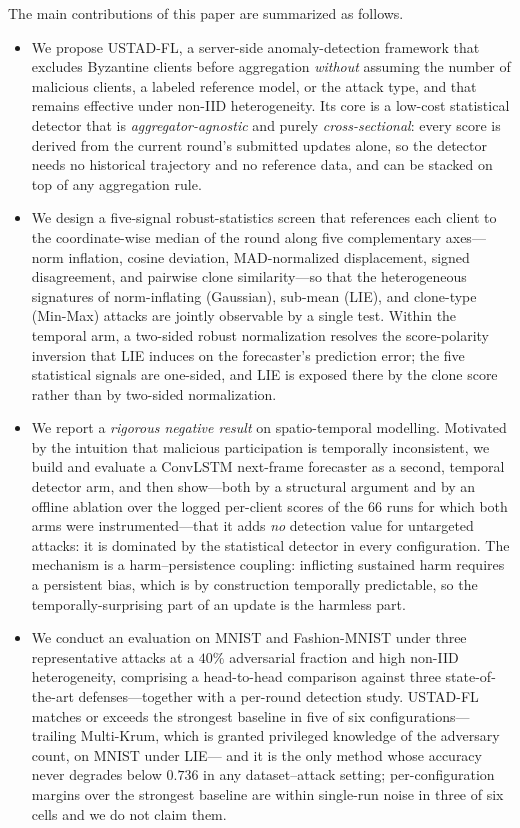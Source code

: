 \documentclass[journal]{IEEEtran}
\begin{document}
The main contributions of this paper are summarized as follows.
\begin{itemize}
    \item We propose USTAD-FL, a server-side anomaly-detection framework that excludes Byzantine clients before aggregation \emph{without} assuming the number of malicious clients, a labeled reference model, or the attack type, and that remains effective under non-IID heterogeneity. Its core is a low-cost statistical detector that is \emph{aggregator-agnostic} and purely \emph{cross-sectional}: every score is derived from the current round's submitted updates alone, so the detector needs no historical trajectory and no reference data, and can be stacked on top of any aggregation rule.
    \item We design a five-signal robust-statistics screen that references each client to the coordinate-wise median of the round along five complementary axes---norm inflation, cosine deviation, MAD-normalized displacement, signed disagreement, and pairwise clone similarity---so that the heterogeneous signatures of norm-inflating (Gaussian), sub-mean (LIE), and clone-type (Min-Max) attacks are jointly observable by a single test. Within the temporal arm, a two-sided robust normalization resolves the score-polarity inversion that LIE induces on the forecaster's prediction error; the five statistical signals are one-sided, and LIE is exposed there by the clone score rather than by two-sided normalization.
    \item We report a \emph{rigorous negative result} on spatio-temporal modelling. Motivated by the intuition that malicious participation is temporally inconsistent, we build and evaluate a ConvLSTM next-frame forecaster as a second, temporal detector arm, and then show---both by a structural argument and by an offline ablation over the logged per-client scores of the $66$ runs for which both arms were instrumented---that it adds \emph{no} detection value for untargeted attacks: it is dominated by the statistical detector in every configuration. The mechanism is a harm--persistence coupling: inflicting sustained harm requires a persistent bias, which is by construction temporally predictable, so the temporally-surprising part of an update is the harmless part.
    \item We conduct an evaluation on MNIST and Fashion-MNIST under three representative attacks at a $40\%$ adversarial fraction and high non-IID heterogeneity, comprising a head-to-head comparison against three state-of-the-art defenses---together with a per-round detection study. USTAD-FL matches or exceeds the strongest baseline in five of six configurations---trailing Multi-Krum, which is granted privileged knowledge of the adversary count, on MNIST under LIE--- and it is the only method whose accuracy never degrades below $0.736$ in any dataset--attack setting; per-configuration margins over the strongest baseline are within single-run noise in three of six cells and we do not claim them.
\end{itemize}
\end{document}

